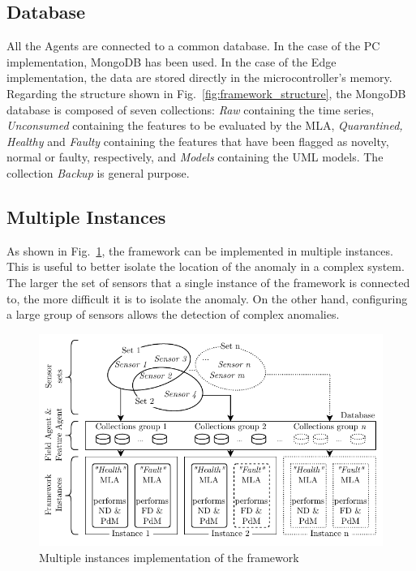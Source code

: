 \subsection{Database}
All the Agents are connected to a common database. In the case of the PC implementation, MongoDB has been used. In the case of the Edge implementation, the data are stored directly in the microcontroller's memory.
Regarding the structure shown in Fig.~\ref{fig:framework_structure}, the MongoDB database is composed of seven collections: \emph{Raw} containing the time series, \emph{Unconsumed} containing the features to be evaluated by the MLA, \emph{Quarantined, Healthy} and \emph{Faulty} containing the features that have been flagged as novelty, normal or faulty, respectively, and \emph{Models} containing the UML models. The collection \emph{Backup} is general purpose.

\subsection{Multiple Instances}
As shown in Fig.~\ref{fig:multiple_instances}, the framework can be implemented in multiple instances. This is useful to better isolate the location of the anomaly in a complex system. The larger the set of sensors that a single instance of the framework is connected to, the more difficult it is to isolate the anomaly. On the other hand, configuring a large group of sensors allows the detection of complex anomalies.

\begin{figure}
    \includegraphics[width=\linewidth]{images/FrameworkInstances.pdf}
    \caption{Multiple instances implementation of the framework}
    \label{fig:multiple_instances}
\end{figure}


